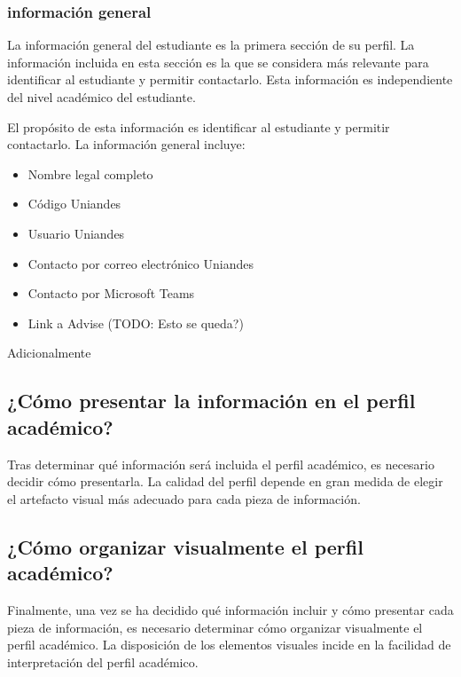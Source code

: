 \subsubsection{información general}

La información general del estudiante es la primera sección de su perfil. La información incluida en esta sección es la que se considera más relevante para identificar al estudiante y permitir contactarlo. Esta información es independiente del nivel académico del estudiante.


El propósito de esta información es identificar al estudiante y permitir contactarlo. La información general incluye:
\begin{itemize}
  \item Nombre legal completo
  \item Código Uniandes
  \item Usuario Uniandes
  \item Contacto por correo electrónico Uniandes
  \item Contacto por Microsoft Teams
  \item Link a Advise (TODO: Esto se queda?)
\end{itemize}

Adicionalmente



\subsection{¿Cómo presentar la información en el perfil académico?}



Tras determinar qué información será incluida el perfil académico, es necesario decidir cómo presentarla. La calidad del perfil depende en gran medida de elegir el artefacto visual más adecuado para cada pieza de información.





\subsection{¿Cómo organizar visualmente el perfil académico?}

Finalmente, una vez se ha decidido qué información incluir y cómo presentar cada pieza de información, es necesario determinar cómo organizar visualmente el perfil académico. La disposición de los elementos visuales incide en la facilidad de interpretación del perfil académico.







